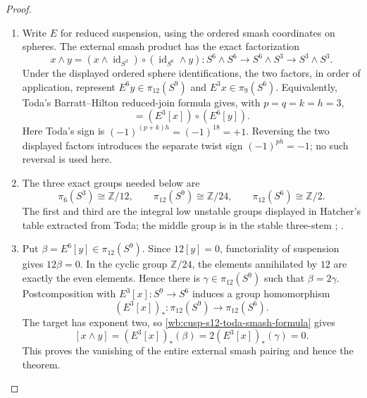 \begin{proof}
\begin{enumerate}[label=\arabic*.,leftmargin=*]
\item Write \(E\) for reduced suspension, using the ordered smash coordinates on
spheres.  The external smash product has the exact factorization
\begin{equation}
 x\wedge y
 =
 (x\wedge\operatorname{id}_{S^3})
 \circ
 (\operatorname{id}_{S^6}\wedge y):
 S^6\wedge S^6\longrightarrow S^6\wedge S^3
 \longrightarrow S^3\wedge S^3.
 \label{wb:cusp-s12-smash-factorization}
\end{equation}
Under the displayed ordered sphere identifications, the two factors, in
order of application, represent \(E^6y\in\pi_{12}(S^9)\) and
\(E^3x\in\pi_9(S^6)\).  Equivalently, Toda's
Barratt--Hilton reduced-join formula gives, with
\(p=q=k=h=3\),
\begin{equation}
 [x\wedge y]=(E^3[x])\circ(E^6[y]).
 \label{wb:cusp-s12-toda-smash-formula}
\end{equation}
Here Toda's sign is \((-1)^{(p+k)h}=(-1)^{18}=+1\).  Reversing the
two displayed factors introduces the separate twist sign
\((-1)^{ph}=-1\); no such reversal is used here.

\item The three exact groups needed below are
\begin{equation}
 \pi_6(S^3)\cong\mathbb Z/12,
 \qquad
 \pi_{12}(S^9)\cong\mathbb Z/24,
 \qquad
 \pi_{12}(S^6)\cong\mathbb Z/2.
 \label{wb:cusp-s12-three-stem-groups}
\end{equation}
The first and third are the integral low unstable groups displayed in
Hatcher's table extracted from Toda; the middle group is in the stable
three-stem
\cite[opening table, p.~339]{Hatcher2002};
\cite[Table~1, p.~113]{IsaksenWangXu2023}.

\item Put \(\beta=E^6[y]\in\pi_{12}(S^9)\).  Since
\(12[y]=0\), functoriality of suspension gives \(12\beta=0\).  In the
cyclic group \(\mathbb Z/24\), the elements annihilated by \(12\) are
exactly the even elements.  Hence there is
\(\gamma\in\pi_{12}(S^9)\) such that \(\beta=2\gamma\).
Postcomposition with \(E^3[x]:S^9\to S^6\) induces a group homomorphism
\[
 (E^3[x])_*:\pi_{12}(S^9)\longrightarrow\pi_{12}(S^6).
\]
The target has exponent two, so \cref{wb:cusp-s12-toda-smash-formula} gives
\[
 [x\wedge y]
 =(E^3[x])_*(\beta)
 =2(E^3[x])_*(\gamma)
 =0.
\]
This proves the vanishing of the entire external smash pairing and hence
the theorem.
\end{enumerate}
\end{proof}

